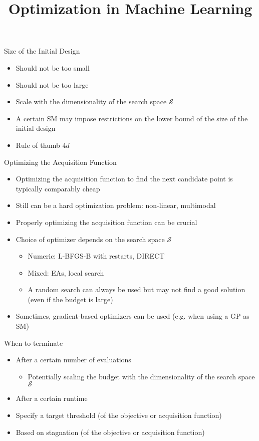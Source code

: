 \documentclass[11pt,compress,t,notes=noshow, xcolor=table]{beamer}
\title{Optimization in Machine Learning}
\date{}
\begin{document}

\begin{frame}{Size of the Initial Design}
  \begin{itemize}
    \item Should not be too small
    \item Should not be too large
    \item Scale with the dimensionality of the search space $\mathcal{S}$
    \item A certain SM may impose restrictions on the lower bound of the size of the initial design
    \item Rule of thumb $4d$
  \end{itemize}
\end{frame}

\begin{frame}{Optimizing the Acquisition Function}
  \begin{itemize}
    \item Optimizing the acquisition function to find the next candidate point is typically comparably cheap
    \item Still can be a hard optimization problem: non-linear, multimodal
    \item Properly optimizing the acquisition function can be crucial
    \item Choice of optimizer depends on the search space $\mathcal{S}$
      \begin{itemize}
        \item Numeric: L-BFGS-B with restarts, DIRECT
        \item Mixed: EAs, local search
        \item A random search can always be used but may not find a good solution (even if the budget is large)
      \end{itemize}
    \item Sometimes, gradient-based optimizers can be used (e.g. when using a GP as SM)
  \end{itemize}
\end{frame}

\begin{frame}{When to terminate}
  \begin{itemize}
    \item After a certain number of evaluations
      \begin{itemize}
        \item Potentially scaling the budget with the dimensionality of the search space $\mathcal{S}$
       \end{itemize}
    \item After a certain runtime
    \item Specify a target threshold (of the objective or acquisition function)
    \item Based on stagnation (of the objective or acquisition function)
  \end{itemize}
\end{frame}
\end{document}
